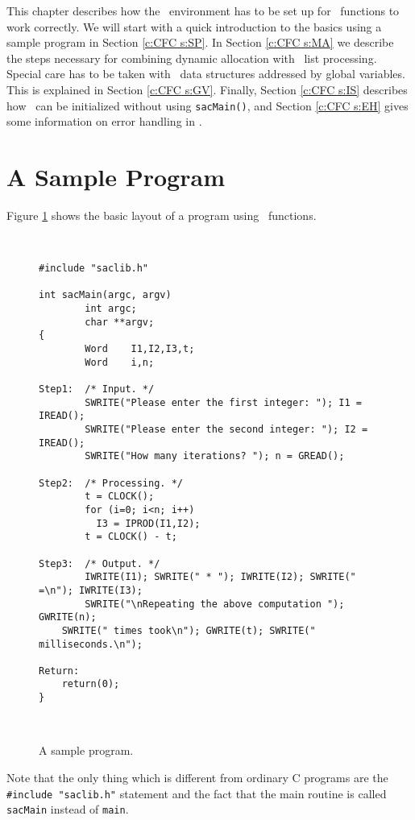 This chapter describes how the \saclib\ environment has to be set up for
\saclib\ functions to work correctly. We will start with a quick
introduction to the basics using a sample program in Section \ref{c:CFC
s:SP}. In Section \ref{c:CFC s:MA} we describe the steps necessary for
combining dynamic allocation with \saclib\ list processing. Special care
has to be taken with \saclib\ data structures addressed by global
variables. This is explained in Section \ref{c:CFC s:GV}. Finally, Section
\ref{c:CFC s:IS} describes how \saclib\ can be initialized without using
{\tt sacMain()}, and Section \ref{c:CFC s:EH} gives some information on
error handling in \saclib.


\section{A Sample Program}
\label{c:CFC s:SP}

Figure \ref{f:sample} shows the basic layout of a program using \saclib\
functions.

\begin{figure}[htb]
\ \hrulefill\ \small
\begin{verbatim}
#include "saclib.h"

int sacMain(argc, argv)
        int argc;
        char **argv;
{
        Word    I1,I2,I3,t;
        Word    i,n;

Step1:  /* Input. */
        SWRITE("Please enter the first integer: "); I1 = IREAD();
        SWRITE("Please enter the second integer: "); I2 = IREAD();
        SWRITE("How many iterations? "); n = GREAD();

Step2:  /* Processing. */
        t = CLOCK();
        for (i=0; i<n; i++)
          I3 = IPROD(I1,I2);
        t = CLOCK() - t;

Step3:  /* Output. */
        IWRITE(I1); SWRITE(" * "); IWRITE(I2); SWRITE(" =\n"); IWRITE(I3);
        SWRITE("\nRepeating the above computation "); GWRITE(n);
	SWRITE(" times took\n"); GWRITE(t); SWRITE(" milliseconds.\n");

Return:
	return(0);
}
\end{verbatim}
\ \hrulefill\ \normalsize
\caption{A sample program.}
\label{f:sample}
\end{figure}

Note that the only thing which is different from ordinary C programs are
the {\tt \#include "saclib.h"} statement and the fact that the main routine
is called {\tt sacMain} instead of {\tt main}.

